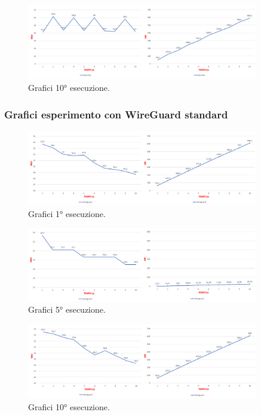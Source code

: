 \begin{figure}[h] \includegraphics[width=0.9\textwidth] {Tesi magistrale/capitoli/images/16.png}
\centering
\caption{Grafici 10° esecuzione.}
\end{figure}

\newpage
\subsubsection{Grafici esperimento con WireGuard standard}

\begin{figure}[h] \includegraphics[width=0.9\textwidth] {Tesi magistrale/capitoli/images/17.png}
\centering
\caption{Grafici 1° esecuzione.}
\end{figure}

\begin{figure}[h] \includegraphics[width=0.9\textwidth] {Tesi magistrale/capitoli/images/18.png}
\centering
\caption{Grafici 5° esecuzione.}
\end{figure}

\begin{figure}[h] \includegraphics[width=0.9\textwidth] {Tesi magistrale/capitoli/images/19.png}
\centering
\caption{Grafici 10° esecuzione.}
\end{figure}

